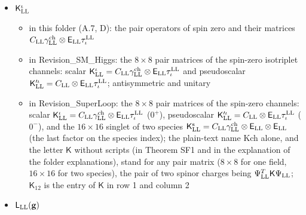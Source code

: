 \documentclass[
  10pt,
]{article}
\providecommand{\tightlist}{%
  \setlength{\itemsep}{0pt}\setlength{\parskip}{0pt}}
\begin{document}
\begin{itemize}
  \begin{itemize}
  \tightlist
  \item
    in this folder (A.7, D): the matrix
    \(\begin{pmatrix}0&1\\-1&0\end{pmatrix}\) (Lord's \(\epsilon\))
  \item
    in Revision\_SM\_Higgs: the real antisymmetric \(2\times2\) matrix
    \(i\sigma^{\rm LL}_2=\begin{pmatrix}0&1\\-1&0\end{pmatrix}\),
    \(\mathsf E_{\rm LL}^{-1}=\mathsf E_{\rm LL}^T=-\mathsf E_{\rm LL}\)
  \item
    in Revision\_SuperLoop: the real antisymmetric \(2\times2\) matrix
    \(i\sigma^{\rm LL}_2=\begin{pmatrix}0&1\\-1&0\end{pmatrix}\), with
    \(\mathsf E_{\rm LL}^{-1}=\mathsf E_{\rm LL}^T=-\mathsf E_{\rm LL}\);
    it acts on a Weyl, isospin or species index, as stated at each place
  \end{itemize}
\item
  \(\mathsf K^\iota_{\rm LL}\)

  \begin{itemize}
  \tightlist
  \item
    in this folder (A.7, D): the pair operators of spin zero and their
    matrices
    \(C_{\rm LL}\gamma^{\rm ch}_{\rm LL}\otimes\mathsf E_{\rm LL}\tau^{\rm LL}_\iota\)
  \item
    in Revision\_SM\_Higgs: the \(8\times8\) pair matrices of the
    spin-zero isotriplet channels: scalar
    \(\mathsf K^\iota_{\rm LL}=C_{\rm LL}\gamma^{\rm ch}_{\rm LL}\otimes\mathsf E_{\rm LL}\tau^{\rm LL}_\iota\)
    and pseudoscalar
    \(\mathsf K'^\iota_{\rm LL}=C_{\rm LL}\otimes\mathsf E_{\rm LL}\tau^{\rm LL}_\iota\);
    antisymmetric and unitary
  \item
    in Revision\_SuperLoop: the \(8\times8\) pair matrices of the
    spin-zero channels: scalar
    \(\mathsf K^\iota_{\rm LL}=C_{\rm LL}\gamma^{\rm ch}_{\rm LL}\otimes\mathsf E_{\rm LL}\tau^{\rm LL}_\iota\)
    (\(0^+\)), pseudoscalar
    \(\mathsf K'^\iota_{\rm LL}=C_{\rm LL}\otimes\mathsf E_{\rm LL}\tau^{\rm LL}_\iota\)
    (\(0^-\)), and the \(16\times16\) singlet of two species
    \(\mathsf K^{\rm s}_{\rm LL}=C_{\rm LL}\gamma^{\rm ch}_{\rm LL}\otimes\mathsf E_{\rm LL}\otimes\mathsf E_{\rm LL}\)
    (the last factor on the species index); the plain-text name Kch
    alone, and the letter \(\mathsf K\) without scripts (in Theorem SF1
    and in the explanation of the folder explanations), stand for any
    pair matrix (\(8\times8\) for one field, \(16\times16\) for two
    species), the pair of two spinor charges being
    \(\Psi^T_{\rm LL}\mathsf K\Psi_{\rm LL}\); \(\mathsf K_{12}\) is the
    entry of \(\mathsf K\) in row 1 and column 2
  \end{itemize}
\item
  \(\mathsf L_{\rm LL}(\mathbf g)\)


\end{itemize}
\end{document}
